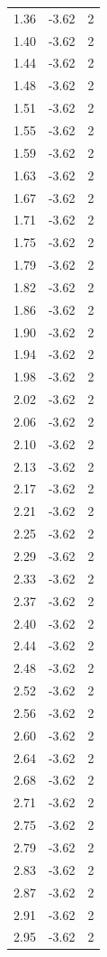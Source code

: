 \begin{longtable}{lrr}
  1.36 & -3.62 & 2 \\
  1.40 & -3.62 & 2 \\
  1.44 & -3.62 & 2 \\
  1.48 & -3.62 & 2 \\
  1.51 & -3.62 & 2 \\
  1.55 & -3.62 & 2 \\
  1.59 & -3.62 & 2 \\
  1.63 & -3.62 & 2 \\
  1.67 & -3.62 & 2 \\
  1.71 & -3.62 & 2 \\
  1.75 & -3.62 & 2 \\
  1.79 & -3.62 & 2 \\
  1.82 & -3.62 & 2 \\
  1.86 & -3.62 & 2 \\
  1.90 & -3.62 & 2 \\
  1.94 & -3.62 & 2 \\
  1.98 & -3.62 & 2 \\
  2.02 & -3.62 & 2 \\
  2.06 & -3.62 & 2 \\
  2.10 & -3.62 & 2 \\
  2.13 & -3.62 & 2 \\
  2.17 & -3.62 & 2 \\
  2.21 & -3.62 & 2 \\
  2.25 & -3.62 & 2 \\
  2.29 & -3.62 & 2 \\
  2.33 & -3.62 & 2 \\
  2.37 & -3.62 & 2 \\
  2.40 & -3.62 & 2 \\
  2.44 & -3.62 & 2 \\
  2.48 & -3.62 & 2 \\
  2.52 & -3.62 & 2 \\
  2.56 & -3.62 & 2 \\
  2.60 & -3.62 & 2 \\
  2.64 & -3.62 & 2 \\
  2.68 & -3.62 & 2 \\
  2.71 & -3.62 & 2 \\
  2.75 & -3.62 & 2 \\
  2.79 & -3.62 & 2 \\
  2.83 & -3.62 & 2 \\
  2.87 & -3.62 & 2 \\
  2.91 & -3.62 & 2 \\
  2.95 & -3.62 & 2 \\

\end{longtable}
